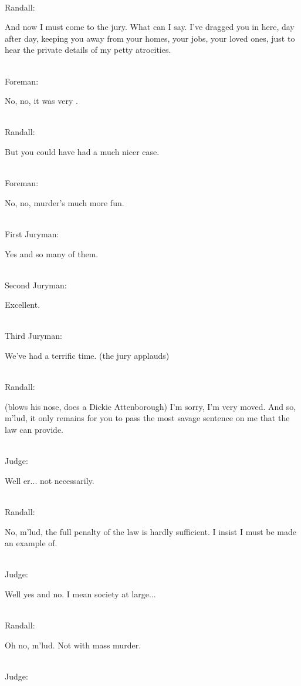 \documentclass{report}
\begin{document}
\noindent\\ Randall: 	

And now I must come to the jury. What can I say. I've dragged you in here, day after day, keeping you away from your homes, your jobs, your loved ones, just to hear the private details of my petty atrocities.

\noindent\\ Foreman: 	

No, no, it was very .

\noindent\\ Randall: 	

But you could have had a much nicer case.

\noindent\\ Foreman: 	

No, no, murder's much more fun.

\noindent\\ First Juryman: 	

Yes and so many of them.

\noindent\\ Second Juryman: 	

Excellent.

\noindent\\ Third Juryman: 	

We've had a terrific time. (the jury applauds)

\noindent\\ Randall: 	

(blows his nose, does a Dickie Attenborough) I'm sorry, I'm very moved. And so, m'lud, it only remains for you to pass the most savage sentence on me that the law can provide.

\noindent\\ Judge: 	

Well er... not necessarily.

\noindent\\ Randall: 	

No, m'lud, the full penalty of the law is hardly sufficient. I insist I must be made an example of.

\noindent\\ Judge: 	

Well yes and no. I mean society at large...

\noindent\\ Randall: 	

Oh no, m'lud. Not with mass murder.

\noindent\\ Judge: 	
\end{document}
